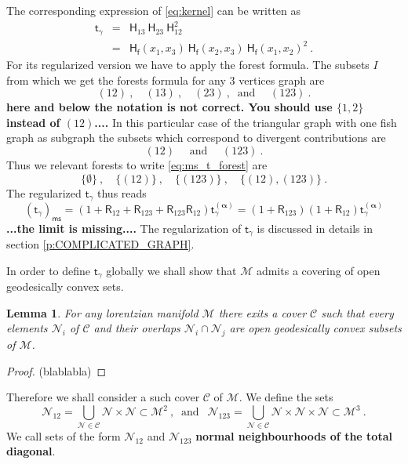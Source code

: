 \documentclass[11pt]{book}
\newcommand{\com}[1]{{\color{red}\bf #1}}
\newcommand{\ms}{\mathsf{ms}}
\newcommand{\alphabd}{\boldsymbol{\alpha}}
\newcommand{\Ccal}{\mathcal{C}}
\newcommand{\Mcal}{\mathcal{M}}
\newcommand{\Ncal}{\mathcal{N}}
\newcommand{\Hsf}{\mathsf{H}}
\newcommand{\Rsf}{\mathsf{R}}
\newcommand{\fsf}{\mathsf{f}}
\newcommand{\tsf}{\mathsf{t}}
\theoremstyle{break}
\newtheorem{lemma}{Lemma}[chapter]
\begin{document}
The corresponding expression of \ref{eq:kernel} can be written as 
%
\begin{eqnarray*}
\tsf_\gamma &=& \Hsf_{13} \ \Hsf_{23} \ \Hsf_{12}^2 \\
&=& \Hsf_\fsf(x_1,x_3) \ \Hsf_\fsf(x_2,x_3) \ \Hsf_\fsf(x_1,x_2)^2 \ .
\end{eqnarray*}
%
For its regularized version we have to apply the forest formula. The subsets $I$ from which we get the forests formula for any $3$ vertices graph are
%
\begin{equation*}
(12) \ , \quad (13) \ , \quad (23) \ , \ \mbox{ and } \quad (123) \ .
\end{equation*}
\com{here and below the notation is not correct. You should use $\{1,2\}$ instead of $(12)$....}
%
In this particular case of the triangular graph with one fish graph as subgraph the subsets which correspond to divergent contributions are 
%
\begin{equation*}
(12) \quad \mbox{ and } \quad (123) \ .
\end{equation*}
%
Thus we relevant forests to write \eqref{eq:ms_t_forest} are 
%
\begin{equation*}
\{\emptyset\} \ , \quad \{(12)\} \ , \quad \{(123)\} \ , \quad \{(12),(123)\} \ .
\end{equation*} 
%
The regularized $\tsf_\gamma$ thus reads
\begin{equation}
\left(\tsf_\gamma\right)_\ms = \left(1+\Rsf_{12}+\Rsf_{123}+\Rsf_{123}\Rsf_{12}\right) \tsf^{(\alphabd)}_\gamma = (1+\Rsf_{123})(1+\Rsf_{12}) \tsf^{(\alphabd)}_\gamma
\label{eq:kernel_trig_ms}
\end{equation}
\com{...the limit is missing....}
The regularization of $\tsf_\gamma$ is discussed in details in section \ref{p:COMPLICATED_GRAPH}. 


In order to define $\tsf_\gamma$ globally we shall show that $\Mcal$ admits a covering of open geodesically convex sets.


\begin{lemma}
For any lorentzian manifold $\Mcal$ there exits a cover $\Ccal$ such that every elements $\Ncal_i$ of $\Ccal$ and their overlaps $\Ncal_i \cap \Ncal_j$ are open geodesically convex subsets of $\Mcal$.
\end{lemma}


\begin{proof}
(blablabla)
\end{proof}


Therefore we shall consider a such cover $\Ccal$ of $\Mcal$. We define the sets
%
\begin{equation}
\Ncal_{12} = \bigcup_{\Ncal\in\Ccal} \Ncal \times \Ncal \subset \Mcal^2 \ , \ \mbox{ and } \ \  \Ncal_{123} = \bigcup_{\Ncal\in\Ccal} \Ncal \times \Ncal\times \Ncal \subset \Mcal^3 \ . 
\label{eq:neighborhood_glob}
\end{equation}
%
We call sets of the form $\Ncal_{12}$ and $\Ncal_{123}$ \textbf{normal neighbourhoods of the total diagonal}. 
\end{document}
